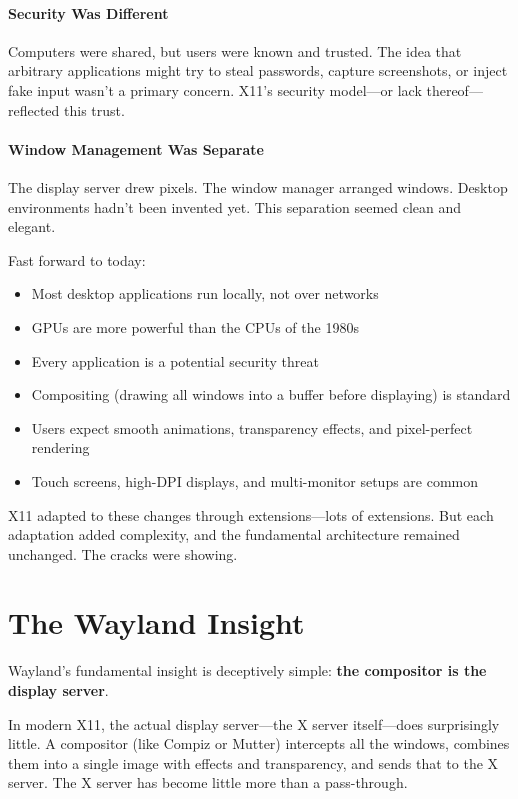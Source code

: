 \paragraph{Security Was Different} Computers were shared, but users were known and trusted. The idea that arbitrary applications might try to steal passwords, capture screenshots, or inject fake input wasn't a primary concern. X11's security model—or lack thereof—reflected this trust.

\paragraph{Window Management Was Separate} The display server drew pixels. The window manager arranged windows. Desktop environments hadn't been invented yet. This separation seemed clean and elegant.

Fast forward to today:

\begin{itemize}
    \item Most desktop applications run locally, not over networks
    \item GPUs are more powerful than the CPUs of the 1980s
    \item Every application is a potential security threat
    \item Compositing (drawing all windows into a buffer before displaying) is standard
    \item Users expect smooth animations, transparency effects, and pixel-perfect rendering
    \item Touch screens, high-DPI displays, and multi-monitor setups are common
\end{itemize}

X11 adapted to these changes through extensions—lots of extensions. But each adaptation added complexity, and the fundamental architecture remained unchanged. The cracks were showing.

\section*{The Wayland Insight}

Wayland's fundamental insight is deceptively simple: \textbf{the compositor is the display server}.

In modern X11, the actual display server—the X server itself—does surprisingly little. A compositor (like Compiz or Mutter) intercepts all the windows, combines them into a single image with effects and transparency, and sends that to the X server. The X server has become little more than a pass-through.

